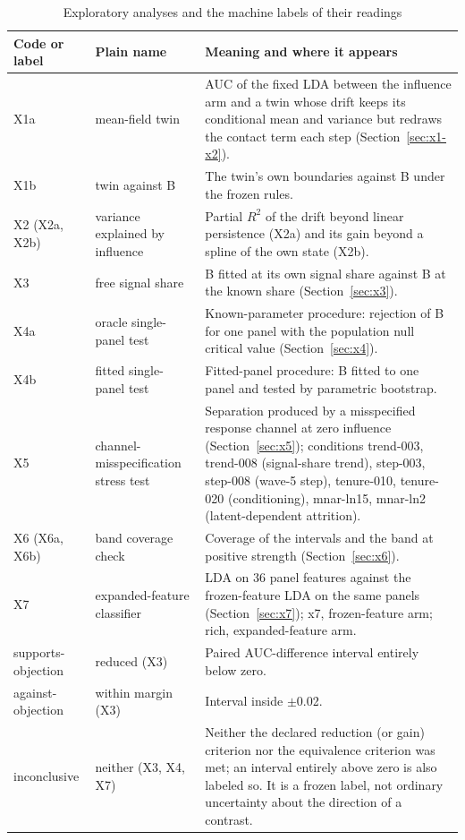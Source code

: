 \begin{table}[htbp]
\caption{Exploratory analyses and the machine labels of their readings}\label{tab:glossary-analyses}
\centering\footnotesize
\begin{tabular}{@{}>{\raggedright\arraybackslash}p{}>{\raggedright\arraybackslash}p{}>{\raggedright\arraybackslash}p{}@{}}
\toprule
Code or label & Plain name & Meaning and where it appears \\
\midrule
X1a & mean-field twin & AUC of the fixed LDA between the influence arm and a twin whose drift keeps its conditional mean and variance but redraws the contact term each step (Section~\ref{sec:x1-x2}). \\
X1b & twin against B & The twin's own boundaries against B under the frozen rules. \\
X2 (X2a, X2b) & variance explained by influence & Partial $R^2$ of the drift beyond linear persistence (X2a) and its gain beyond a spline of the own state (X2b). \\
X3 & free signal share & B fitted at its own signal share against B at the known share (Section~\ref{sec:x3}). \\
X4a & oracle single-panel test & Known-parameter procedure: rejection of B for one panel with the population null critical value (Section~\ref{sec:x4}). \\
X4b & fitted single-panel test & Fitted-panel procedure: B fitted to one panel and tested by parametric bootstrap. \\
X5 & channel-misspecification stress test & Separation produced by a misspecified response channel at zero influence (Section~\ref{sec:x5}); conditions trend-003, trend-008 (signal-share trend), step-003, step-008 (wave-5 step), tenure-010, tenure-020 (conditioning), mnar-ln15, mnar-ln2 (latent-dependent attrition). \\
X6 (X6a, X6b) & band coverage check & Coverage of the intervals and the band at positive strength (Section~\ref{sec:x6}). \\
X7 & expanded-feature classifier & LDA on 36 panel features against the frozen-feature LDA on the same panels (Section~\ref{sec:x7}); x7, frozen-feature arm; rich, expanded-feature arm. \\
supports-objection & reduced (X3) & Paired AUC-difference interval entirely below zero. \\
against-objection & within margin (X3) & Interval inside $\pm$0.02. \\
inconclusive & neither (X3, X4, X7) & Neither the declared reduction (or gain) criterion nor the equivalence criterion was met; an interval entirely above zero is also labeled so. It is a frozen label, not ordinary uncertainty about the direction of a contrast. \\

\end{tabular}
\end{table}
